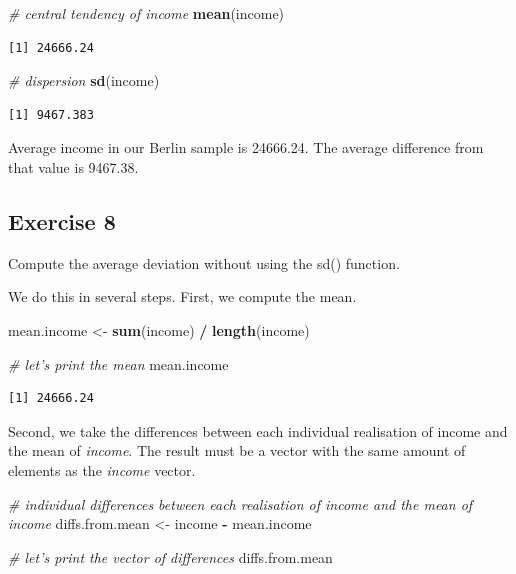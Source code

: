 \documentclass[]{book}
\newenvironment{Shaded}{\begin{snugshade}}{\end{snugshade}}
\newcommand{\KeywordTok}[1]{\textcolor[rgb]{0.13,0.29,0.53}{\textbf{#1}}}
\newcommand{\StringTok}[1]{\textcolor[rgb]{0.31,0.60,0.02}{#1}}
\newcommand{\CommentTok}[1]{\textcolor[rgb]{0.56,0.35,0.01}{\textit{#1}}}
\newcommand{\OperatorTok}[1]{\textcolor[rgb]{0.81,0.36,0.00}{\textbf{#1}}}
\newcommand{\NormalTok}[1]{#1}
\theoremstyle{definition}
\theoremstyle{definition}
\theoremstyle{definition}
\theoremstyle{remark}
\begin{document}
\begin{Shaded}
\begin{Highlighting}[]
\CommentTok{# central tendency of income}
\KeywordTok{mean}\NormalTok{(income)}
\end{Highlighting}
\end{Shaded}

\begin{verbatim}
[1] 24666.24
\end{verbatim}

\begin{Shaded}
\begin{Highlighting}[]
\CommentTok{# dispersion}
\KeywordTok{sd}\NormalTok{(income)}
\end{Highlighting}
\end{Shaded}

\begin{verbatim}
[1] 9467.383
\end{verbatim}

Average income in our Berlin sample is 24666.24. The average difference
from that value is 9467.38.

\subsection{Exercise 8}\label{exercise-8}

Compute the average deviation without using the sd() function.

We do this in several steps. First, we compute the mean.

\begin{Shaded}
\begin{Highlighting}[]
\NormalTok{mean.income <-}\StringTok{ }\KeywordTok{sum}\NormalTok{(income) }\OperatorTok{/}\StringTok{ }\KeywordTok{length}\NormalTok{(income)}

\CommentTok{# let's print the mean}
\NormalTok{mean.income}
\end{Highlighting}
\end{Shaded}

\begin{verbatim}
[1] 24666.24
\end{verbatim}

Second, we take the differences between each individual realisation of
income and the mean of \emph{income}. The result must be a vector with
the same amount of elements as the \emph{income} vector.

\begin{Shaded}
\begin{Highlighting}[]
\CommentTok{# individual differences between each realisation of income and the mean of income}
\NormalTok{diffs.from.mean <-}\StringTok{ }\NormalTok{income }\OperatorTok{-}\StringTok{ }\NormalTok{mean.income}

\CommentTok{# let's print the vector of differences}
\NormalTok{diffs.from.mean}
\end{Highlighting}
\end{Shaded}
\end{document}
